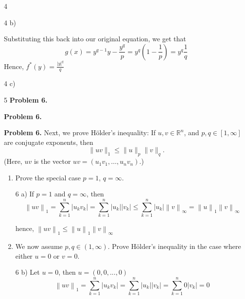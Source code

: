 \documentclass[a4paper,norsk]{article}
\renewcommand{\leq}{\leqslant}
\begin{document}
\begin{oppgavebox}{4}{}
\begin{proofbox}{4 b)}{}
    
  
  
  
  Substituting this back into our original equation, we get that
  \[
      g(x) = y ^{q-1} y - \frac{ y ^{q}  }{ p }  = y ^{q} \left( 1 - \frac{ 1 }{ p } \right)    = y ^{q} \frac{ 1 }{ q }  
  \]
  Hence, $ f ^{*}(y) = \frac{ \left| y \right| ^{q}  }{ q }  $ 
    
\end{proofbox}

\begin{proofbox}{4 c)}{}
  
\end{proofbox}
\end{oppgavebox}

\begin{oppgavebox}{5}{}
\textbf{Problem 6.} 

\textbf{Problem 6.} 

\textbf{Problem 6.} Next, we prove Hölder’s inequality: If $u, v \in \mathbb{R}^n$, and $p, q \in [1,\infty]$ are conjugate exponents, then
\[
\|uv\|_1 \le \|u\|_p \|v\|_q. \tag{2}
\]
(Here, $uv$ is the vector $uv = (u_1 v_1, \dots, u_n v_n)$.)

\begin{enumerate}
\item[(a)] Prove the special case $p = 1$, $q = \infty$.
\begin{proofbox}{6 a)}{}
  If $ p= 1 $ and $ q =\infty $, then
  \[
      \left\lVert uv \right\rVert _1 = \sum_{ k=1 }^{ n } \left| u_k v_k \right| = \sum_{ k=1 }^{ n } \left| u_k \right| \left| v_k \right| \leq \sum_{ k=1 }^{ n } \left| u_k \right| \left\lVert v \right\rVert _{\infty} = \left\lVert u \right\rVert _1 \left\lVert v \right\rVert _{\infty}
  \]

  hence, $ \left\lVert uv \right\rVert _1 \leq \left\lVert u \right\rVert _1  \left\lVert v \right\rVert _{\infty} $ 
  
\end{proofbox}

\item[(b)] We now assume $p, q \in (1,\infty)$. Prove Hölder’s inequality in the case where either $u = 0$ or $v = 0$.
\begin{proofbox}{6 b)}{}
  Let $ u = 0 $, then $ u = \left( 0, 0, ..., 0 \right)  $ 
  \[
      \left\lVert uv \right\rVert _1 = \sum_{ k=1 }^{ n } \left| u_k v_k\right|  = \sum_{ k=1 }^{ n } \left| u_k \right| \left| v_k \right| = \sum_{ k=1 }^{ n } 0 \left| v_k \right| = 0
  \]
    

\end{proofbox}
\end{enumerate}
\end{oppgavebox}
\end{document}
